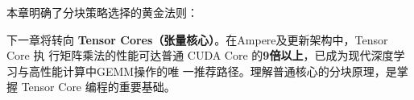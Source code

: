 本章明确了分块策略选择的黄金法则：
\begin{center}
\end{center}

下一章将转向 \textbf{Tensor Cores（张量核心）}。在Ampere及更新架构中，Tensor Core 执
行矩阵乘法的性能可达普通 CUDA Core 的\textbf{9倍以上}，已成为现代深度学习与高性能计算中GEMM操作的唯
一推荐路径。理解普通核心的分块原理，是掌握 Tensor Core 编程的重要基础。

